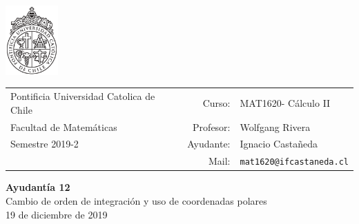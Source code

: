 \documentclass[12pt]{article}
\makeatletter
\newcommand{\ayudantia}{{\sc Ayudantía 12}}
\newcommand{\tituloayu}{Cambio de orden de integración y uso de coordenadas polares}
\newcommand{\fecha}{19 de diciembre de 2019}
\newcommand{\sigla}{MAT1620}
\newcommand{\nombre}{Cálculo II}
\newcommand{\profesor}{Wolfgang Rivera}
\newcommand{\ano}{2019}
\newcommand{\semestre}{2}
\newcommand{\mail}{mat1620@ifcastaneda.cl}
\makeatother
\begin{document}
\thispagestyle{empty}

\begin{minipage}{2cm}
	\includegraphics[width=2cm]{../../../../img/logo.pdf}
	\vspace{0.5cm}
\end{minipage}
\begin{minipage}{\linewidth}
	\begin{tabular}{lrl}
		{\scriptsize\sc Pontificia Universidad Catolica de Chile} & \hspace*{0.7in}Curso: &
		\sigla  - \nombre\\
		{\sc Facultad de Matemáticas}&
		Profesor: & \profesor \\
		{\sc Semestre \ano-\semestre} & Ayudante: & {Ignacio Castañeda}\\
		& {Mail:} & \texttt{\mail}
	\end{tabular}
\end{minipage}

\vspace{-10mm}
\begin{center}
	{\LARGE\bf \ayudantia}\\
	\vspace{0.1cm}
	{\tituloayu}\\
	\vspace{0.1cm}
	\fecha\\
	\vspace{0.4cm}
\end{center}
\end{document}
